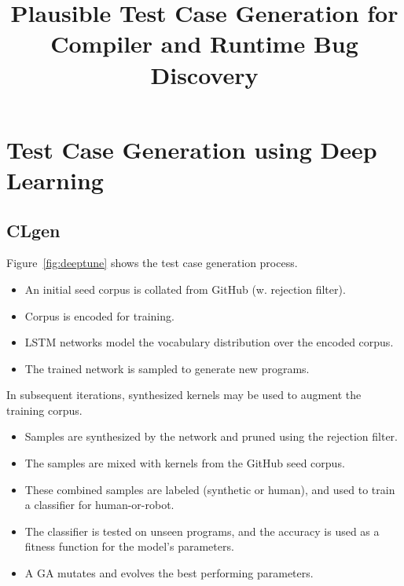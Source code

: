 



\title{Plausible Test Case Generation for Compiler and Runtime Bug Discovery}

%
%

\maketitle






\section{Test Case Generation using Deep Learning}

\subsection{CLgen}

Figure~\ref{fig:deeptune} shows the test case generation process.

\begin{itemize}
\item An initial seed corpus is collated from GitHub (w. rejection filter).
\item Corpus is encoded for training.
\item LSTM networks model the vocabulary distribution over the encoded corpus.
\item The trained network is sampled to generate new programs.
\end{itemize}

\noindent In subsequent iterations, synthesized kernels may be used to augment the training corpus.

\begin{itemize}
\item Samples are synthesized by the network and pruned using the rejection filter.
\item The samples are mixed with kernels from the GitHub seed corpus.
\item These combined samples are labeled (synthetic or human), and used to train a classifier for human-or-robot.
\item The classifier is tested on unseen programs, and the accuracy is used as a fitness function for the model's parameters.
\item A GA mutates and evolves the best performing parameters.
\end{itemize}



